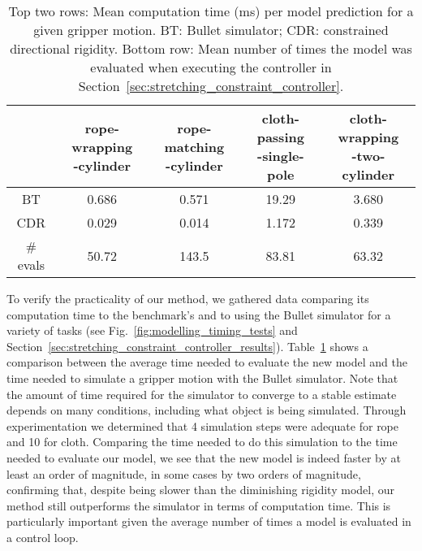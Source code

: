 \begin{table}[ht]
\centering
\caption{Top two rows: Mean computation time (ms) per model prediction for a given gripper motion. BT: Bullet simulator; CDR: constrained directional rigidity. Bottom row: Mean number of times the model was evaluated when executing the controller in Section~\ref{sec:stretching_constraint_controller}.}
\label{tbl:simulation_time_report}
\begin{tabular}{ccccc}
\hline
            & \makecell{rope-wrapping\\-cylinder} 
            & \makecell{rope-matching\\-cylinder}
            & \makecell{cloth-passing\\-single-pole}
            & \makecell{cloth-wrapping\\-two-cylinder} \\
\hline
BT          & 0.686 & 0.571 & 19.29 & 3.680 \\
CDR         & 0.029 & 0.014 & 1.172 & 0.339 \\
\hline
\# evals    & 50.72 & 143.5 & 83.81 & 63.32 \\
\hline
\end{tabular}
\end{table}

To verify the practicality of our method, we gathered data comparing its computation time to the benchmark's and to using the Bullet simulator for a variety of tasks (see Fig.~\ref{fig:modelling_timing_tests} and Section~\ref{sec:stretching_constraint_controller_results}). Table~\ref{tbl:simulation_time_report} shows a comparison between the average time needed to evaluate the new model and the time needed to simulate a gripper motion with the Bullet simulator. Note that the amount of time required for the simulator to converge to a stable estimate depends on many conditions, including what object is being simulated. Through experimentation we determined that 4 simulation steps were adequate for rope and 10 for cloth. Comparing the time needed to do this simulation to the time needed to evaluate our model, we see that the new model is indeed faster by at least an order of magnitude, in some cases by two orders of magnitude, confirming that, despite being slower than the diminishing rigidity model, our method still outperforms the simulator in terms of computation time. This is particularly important given the average number of times a model is evaluated in a control loop.
